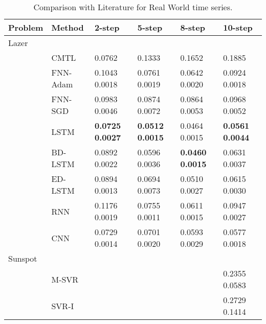 \documentclass{ieeeaccess}
\begin{document}
\begin{table*}[htbp!]

\centering
 \small
 \caption{Comparison with Literature for Real World time series. }
  


\label{tab:Real}
\begin{tabular}{llllll}

  
 \hline
Problem& Method& 2-step & 5-step &8-step& 10-step\\
 \hline
 \hline


Lazer &    	&   	& \\
 






 
&CMTL \cite{chandra2017CMTLMulti} &  0.0762  &  0.1333  	& 0.1652& 0.1885  \\


&FNN-Adam &  0.1043   0.0018    	& 0.0761   0.0019       &	0.0642	 0.0020       &0.0924	0.0018\\

&FNN-SGD  & 0.0983    0.0046     	&   0.0874   0.0072     &	0.0864 	0.0053       &0.0968	0.0052\\

&LSTM   &  \textbf{0.0725  0.0027 }   	&  \textbf{0.0512    0.0015}      &	0.0464 	0.0015       &\textbf{0.0561	0.0044}\\

&BD-LSTM   &  0.0892   0.0022     	&   0.0596   0.0036      &\textbf{0.0460 	0.0015}	       &0.0631	0.0037\\

&ED-LSTM   &  0.0894   0.0013     	& 0.0694   0.0073       &	0.0510 	0.0027       &0.0615	0.0030\\

&RNN  &   0.1176   0.0019    	&  0.0755  0.0011      &0.0611 	0.0015	       &0.0947	0.0027\\

&CNN &  0.0729	0.0014    	&  0.0701	0.0020      & 0.0593	0.0029	       & 0.0577	0.0018\\

 \hline
 
 
Sunspot &    	  &	& \\
 

 &M-SVR \cite{zhang2013iterated} &   	&   &	 & 0.2355   0.0583 \\
 
 &  SVR-I \cite{zhang2013iterated}&   	&   &	 &  0.2729 0.1414  \\
 

\end{tabular}
\end{table*}
\end{document}
